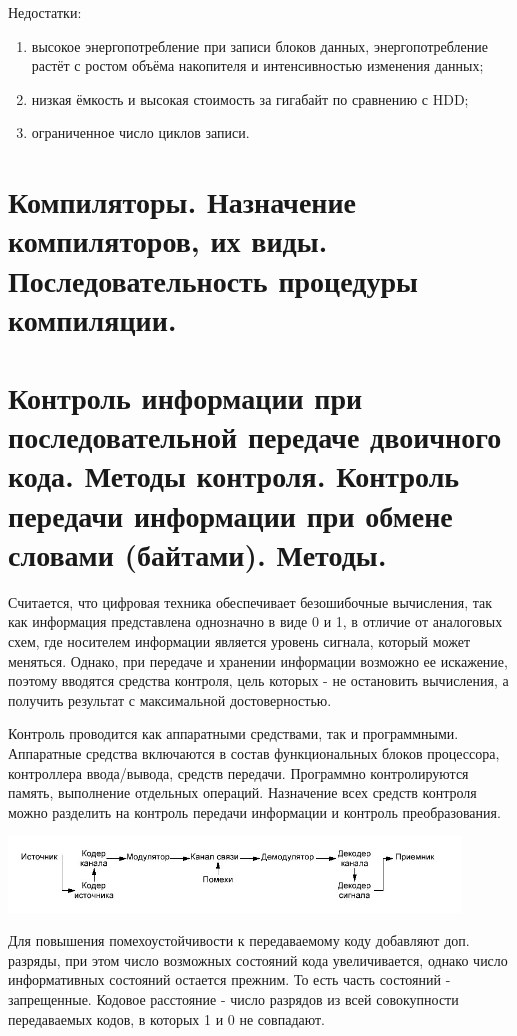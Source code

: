 \documentclass[unicode, 12pt, a4paper, oneside]{article}
\begin{document}
Недостатки: 

\begin{enumerate}
\item высокое энергопотребление при записи блоков данных, энергопотребление растёт с ростом объёма накопителя и интенсивностью изменения данных; 
\item низкая ёмкость и высокая стоимость за гигабайт по сравнению с HDD;
\item ограниченное число циклов записи.
\end{enumerate}

\section{Компиляторы. Назначение компиляторов, их виды. Последовательность процедуры компиляции.}

\section{Контроль информации при последовательной передаче двоичного кода. Методы контроля. Контроль передачи информации при обмене словами (байтами). Методы.}

Считается, что цифровая техника обеспечивает безошибочные вычисления, так как информация представлена однозначно в виде 0 и 1, в отличие от аналоговых схем, где носителем информации является уровень сигнала, который может меняться. Однако, при передаче и хранении информации возможно ее искажение, поэтому вводятся средства контроля, цель которых - не остановить вычисления, а получить результат с максимальной достоверностью.

Контроль проводится как аппаратными средствами, так и программными. Аппаратные средства включаются в состав функциональных блоков процессора, контроллера ввода/вывода, средств передачи. Программно контролируются память, выполнение отдельных операций.
Назначение всех средств контроля можно разделить на контроль передачи информации и контроль преобразования.

\begin{center}
\includegraphics[width=0.9\textwidth]{116_Channel.png}\\
\end{center}
Для повышения помехоустойчивости к передаваемому коду добавляют доп. разряды, при этом число возможных состояний кода увеличивается, однако число информативных состояний остается прежним. То есть часть состояний - запрещенные. Кодовое расстояние - число разрядов из всей совокупности передаваемых кодов, в которых 1 и 0 не совпадают.
\end{document}
